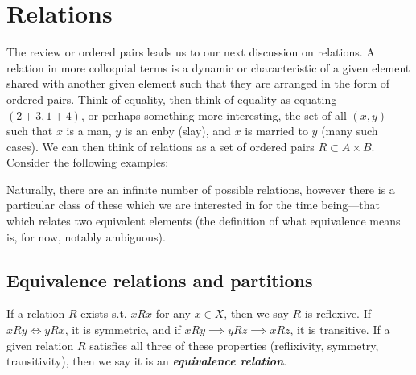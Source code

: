 \documentclass[a4paper]{report}
\begin{document}
\section{Relations}

The review or ordered pairs leads us to our next discussion on relations. A relation in more colloquial terms is a dynamic or characteristic of a given element shared with another given element such that they are arranged in the form of ordered pairs. Think of equality, then think of equality as equating \( (2+3,1+4) \), or perhaps something more interesting, the set of all \( (x,y) \) such that \( x \) is a man, \( y \) is an enby (slay), and \( x \) is married to \( y \) (many such cases). We can then think of relations as a set of ordered pairs \( R \subset A\times B \). Consider the following examples:

Naturally, there are an infinite number of possible relations, however there is a particular class of these which we are interested in for the time being---that which relates two equivalent elements (the definition of what equivalence means is, for now, notably ambiguous). 
\subsection{Equivalence relations and partitions}

If a relation \( R \) exists s.t. \( xRx \) for any \( x \in  X \), then we say \( R \) is reflexive. If \( xRy \iff yRx \), it is symmetric, and if \( xRy \implies yRz \implies xRz \), it is transitive. If a given relation \( R \) satisfies all three of these properties (reflixivity, symmetry, transitivity), then we say it is an \textbf{\textit{equivalence relation}}. 

\end{document}
